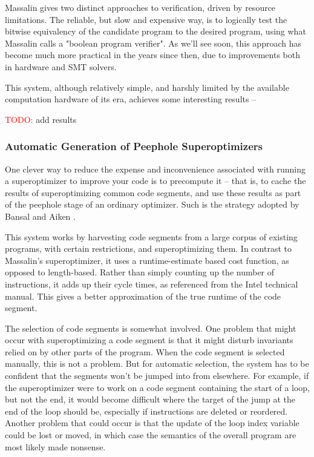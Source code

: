 \documentclass[12pt,twoside]{reedthesis}
\newcommand{\red}[1]{\textcolor{red}{#1}}
\begin{document}
            Massalin gives two distinct approaches to verification, driven by resource limitations.
            The reliable, but slow and expensive way, is to logically test the bitwise equivalency of the candidate program to the desired program, using what Massalin calls a "boolean program verifier".
            As we'll see soon, this approach has become much more practical in the years since then, due to improvements both in hardware and SMT solvers. 
                
            This system, although relatively simple, and harshly limited by the available computation hardware of its era, achieves some interesting results --
                
            \red{TODO:} add results %

        \subsubsection{Automatic Generation of Peephole Superoptimizers}
            One clever way to reduce the expense and inconvenience associated with running a superoptimizer to improve your code is to precompute it
            -- that is, to cache the results of superoptimizing common code segments, and use these results as part of the peephole stage of an ordinary optimizer.
            Such is the strategy adopted by Bansal and Aiken \cite{bansal2006peephole}.
                
            This system works by harvesting code segments from a large corpus of existing programs, with certain restrictions, and superoptimizing them. 
            In contrast to Massalin's superoptimizer, it uses a runtime-estimate based cost function, as opposed to length-based.
            Rather than simply counting up the number of instructions, it adds up their cycle times, as referenced from the Intel technical manual.
            This gives a better approximation of the true runtime of the code segment.
                
            The selection of code segments is somewhat involved.
            One problem that might occur with superoptimizing a code segment is that it might disturb invariants relied on by other parts of the program.
            When the code segment is selected manually, this is not a problem.
            But for automatic selection, the system has to be confident that the segments won't be jumped into from elsewhere.
            For example, if the superoptimizer were to work on a code segment containing the start of a loop, but not the end, it would become difficult where the target of the jump at the end of the loop should be, especially if instructions are deleted or reordered.
            Another problem that could occur is that the update of the loop index variable could be lost or moved, in which case the semantics of the overall program are most likely made nonsense.
                
\end{document}
